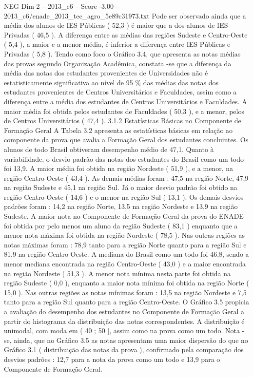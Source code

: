 \begin{textsample}{NEG Dim 2 – 2013\_c6 – Score -3.00 – 2013\_c6/enade\_2013\_tec\_agro\_5e89c31973.txt}
Pode ser observado ainda que a média dos alunos de IES Públicas ( 52,3 ) é maior que a dos alunos de IES Privadas ( 46,5 ).
A diferença entre as médias das regiões Sudeste e Centro-Oeste ( 5,4 ), a maior e a menor média, é inferior a diferença entre IES Públicas e Privadas ( 5,8 ).
Tendo como foco o Gráfico 3.4, que apresenta as notas médias das provas segundo Organização Acadêmica, constata -se que a diferença da média das notas dos estudantes provenientes de Universidades não é estatisticamente significativa ao nível de 95 \% das médias das notas dos estudantes provenientes de Centros Universitários e Faculdades, assim como a diferença entre a média dos estudantes de Centros Universitários e Faculdades.
A maior média foi obtida pelos estudantes de Faculdades ( 50,3 ), e a menor, pelos de Centros Universitários ( 47,4 ). 3.1.2 Estatísticas Básicas no Componente de Formação Geral A Tabela 3.2 apresenta as estatísticas básicas em relação ao componente da prova que avalia a Formação Geral dos estudantes concluintes.
Os alunos de todo Brasil obtiveram desempenho médio de 47,1.
Quanto à variabilidade, o desvio padrão das notas dos estudantes do Brasil como um todo foi 13,9.
A maior média foi obtida na região Nordeste ( 51,9 ), e a menor, na região Centro-Oeste ( 43,4 ).
As demais médias foram : 47,5 na região Norte, 47,9 na região Sudeste e 45,1 na região Sul.
Já o maior desvio padrão foi obtido na região Centro-Oeste ( 14,6 ) e o menor na região Sul ( 13,1 ).
Os demais desvios padrões foram : 14,2 na região Norte, 13,5 na região Nordeste e 13,9 na região Sudeste.
A maior nota no Componente de Formação Geral da prova do ENADE foi obtida por pelo menos um aluno da região Sudeste ( 83,1 ) enquanto que a menor nota máxima foi obtida na região Nordeste ( 78,5 ).
Nas outras regiões as notas máximas foram : 78,9 tanto para a região Norte quanto para a região Sul e 81,9 na região Centro-Oeste.
A mediana do Brasil como um todo foi 46,8, sendo a menor mediana encontrada na região Centro-Oeste ( 43,0 ) e a maior encontrada na região Nordeste ( 51,3 ).
A menor nota mínima nesta parte foi obtida na região Sudeste ( 0,0 ), enquanto a maior nota mínima foi obtida na região Norte ( 15,0 ).
Nas outras regiões as notas mínimas foram : 13,5 na região Nordeste e 7,5 tanto para a região Sul quanto para a região Centro-Oeste.
O Gráfico 3.5 propicia a avaliação do desempenho dos estudantes no Componente de Formação Geral a partir do histograma da distribuição das notas correspondentes.
A distribuição é unimodal, com moda em ( 40 ; 50 ], assim como na prova como um todo.
Nota -se, ainda, que no Gráfico 3.5 as notas apresentam uma maior dispersão do que no Gráfico 3.1 ( distribuição das notas da prova ), confirmado pela comparação dos desvios padrões : 12,7 para a nota da prova como um todo e 13,9 para o Componente de Formação Geral.

\end{textsample}
